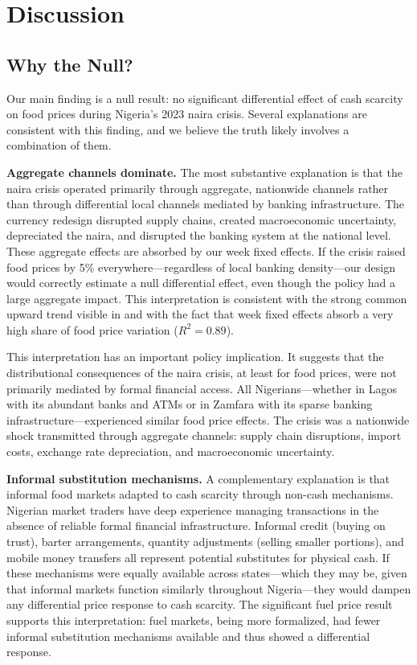 \documentclass[12pt]{article}
\begin{document}
\section{Discussion}

\subsection{Why the Null?}

Our main finding is a null result: no significant differential effect of cash scarcity on food prices during Nigeria's 2023 naira crisis. Several explanations are consistent with this finding, and we believe the truth likely involves a combination of them.

\textbf{Aggregate channels dominate.} The most substantive explanation is that the naira crisis operated primarily through aggregate, nationwide channels rather than through differential local channels mediated by banking infrastructure. The currency redesign disrupted supply chains, created macroeconomic uncertainty, depreciated the naira, and disrupted the banking system at the national level. These aggregate effects are absorbed by our week fixed effects. If the crisis raised food prices by 5\% everywhere---regardless of local banking density---our design would correctly estimate a null differential effect, even though the policy had a large aggregate impact. This interpretation is consistent with the strong common upward trend visible in  and with the fact that week fixed effects absorb a very high share of food price variation ($R^2 = 0.89$).

This interpretation has an important policy implication. It suggests that the distributional consequences of the naira crisis, at least for food prices, were not primarily mediated by formal financial access. All Nigerians---whether in Lagos with its abundant banks and ATMs or in Zamfara with its sparse banking infrastructure---experienced similar food price effects. The crisis was a nationwide shock transmitted through aggregate channels: supply chain disruptions, import costs, exchange rate depreciation, and macroeconomic uncertainty.

\textbf{Informal substitution mechanisms.} A complementary explanation is that informal food markets adapted to cash scarcity through non-cash mechanisms. Nigerian market traders have deep experience managing transactions in the absence of reliable formal financial infrastructure. Informal credit (buying on trust), barter arrangements, quantity adjustments (selling smaller portions), and mobile money transfers all represent potential substitutes for physical cash. If these mechanisms were equally available across states---which they may be, given that informal markets function similarly throughout Nigeria---they would dampen any differential price response to cash scarcity. The significant fuel price result supports this interpretation: fuel markets, being more formalized, had fewer informal substitution mechanisms available and thus showed a differential response.
\end{document}
